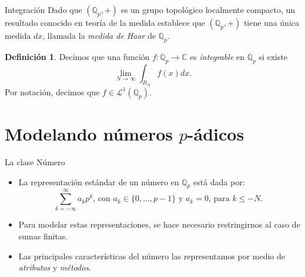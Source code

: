 \documentclass{beamer}
\theoremstyle{definition}
\numberwithin{equation}{section}
\newcommand{\marine}[1]{\textcolor{defColor}{#1}}
\newtheorem{df}{\marine{Definición}}
\newcommand{\tit}[1]{\textit{#1}}
\renewcommand{\leq}{\leqslant}
\newcommand{\C}{\mathbb{C}}
\newcommand{\Qp}{\mathbb{Q}_p}
\begin{document}
\begin{frame}{Integración}
	Dado que $ (\Qp, +)$ es un grupo topológico localmente compacto, un resultado conocido en teoría de la medida establece que $ (\Qp, +)$ tiene
	una única medida $dx$, llamada la \textit{medida de Haar}	de $\Qp$.
	\begin{df}
		Decimos que una función $f\colon\Qp\to\C$  es \textit{integrable} en $\Qp$ si existe 
		$$\lim _{N \rightarrow \infty} \int_{B_{N}} f (x) dx.$$
		Por notación, decimos que $f\in\mathcal{L}^1(\Qp)$.
		
		
	\end{df}
\end{frame}

\section{Modelando números $p$-ádicos}

\begin{frame}{La clase Número}
	\begin{itemize}[<+- | alert@+>]
		\item La representación estándar de un número en $\Qp$ está dada por:
		\begin{equation}
		\sum_{k=-\infty}^{\infty} a_{k} p^{k}\text{, con $a_k\in\{0,\dots,p-1\}$ y $a_k=0$, para $k\leq - N$. 
		}	\label{num_rep}
		\end{equation}
		\item Para modelar estas representaciones, se hace necesario restringirnos al caso de sumas finitas.
		\item Las principales características del número las representamos por medio de \tit{atributos} y \tit{métodos}.
	\end{itemize}
\end{frame}
\end{document}
